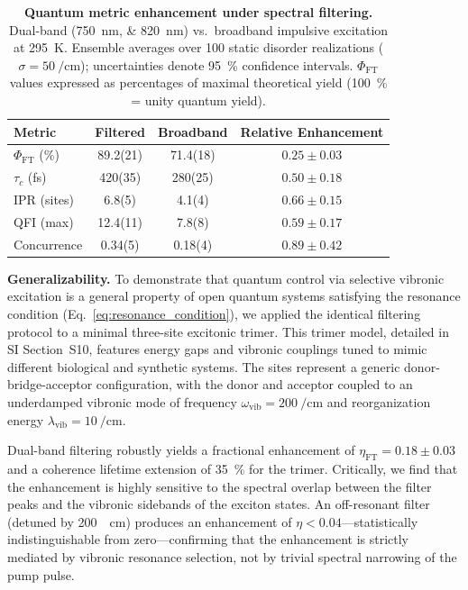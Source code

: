 \documentclass[journal=jpcl,manuscript=letter]{achemso}
\begin{document}
\begin{table}[t]
\centering
\caption{\textbf{Quantum metric enhancement under spectral filtering.} Dual-band (\SIlist{750;820}{\nano\meter}) vs.\ broadband impulsive excitation at \SI{295}{\kelvin}. Ensemble averages over \num{100} static disorder realizations ($\sigma = \SI{50}{\per\centi\meter}$); uncertainties denote \SI{95}{\percent} confidence intervals. $\Phi_{\mathrm{FT}}$ values expressed as percentages of maximal theoretical yield (\SI{100}{\percent} = unity quantum yield).}
\label{tab:quantum_metrics}
\begin{tabular}{lccc}
\toprule
\textbf{Metric} & \textbf{Filtered} & \textbf{Broadband} & \textbf{Relative Enhancement} \\
\midrule
$\Phi_{\mathrm{FT}}$ (\si{\percent}) & 89.2(21) & 71.4(18) & $0.25 \pm 0.03$ \\
$\tau_c$ (\si{\femto\second}) & 420(35) & 280(25) & $0.50 \pm 0.18$ \\
IPR (sites) & 6.8(5) & 4.1(4) & $0.66 \pm 0.15$ \\
QFI (max) & 12.4(11) & 7.8(8) & $0.59 \pm 0.17$ \\
Concurrence & 0.34(5) & 0.18(4) & $0.89 \pm 0.42$ \\
\bottomrule
\end{tabular}
\end{table}

\textbf{Generalizability.}
To demonstrate that quantum control via selective vibronic excitation is a general property of open quantum systems satisfying the resonance condition (Eq.~\cref{eq:resonance_condition}), we applied the identical filtering protocol to a minimal three-site excitonic trimer. This trimer model, detailed in SI Section~S10, features energy gaps and vibronic couplings tuned to mimic different biological and synthetic systems. The sites represent a generic donor-bridge-acceptor configuration, with the donor and acceptor coupled to an underdamped vibronic mode of frequency $\omega_{\mathrm{vib}} = \SI{200}{\per\centi\meter}$ and reorganization energy $\lambda_{\mathrm{vib}} = \SI{10}{\per\centi\meter}$.

Dual-band filtering robustly yields a fractional enhancement of $\eta_{\mathrm{FT}} = 0.18 \pm 0.03$ and a coherence lifetime extension of \SI{35}{\percent} for the trimer. Critically, we find that the enhancement is highly sensitive to the spectral overlap between the filter peaks and the vibronic sidebands of the exciton states. An off-resonant filter (detuned by \SI{200}{\per\centi\meter}) produces an enhancement of $\eta < 0.04$---statistically indistinguishable from zero---confirming that the enhancement is strictly mediated by vibronic resonance selection, not by trivial spectral narrowing of the pump pulse. 
\end{document}
